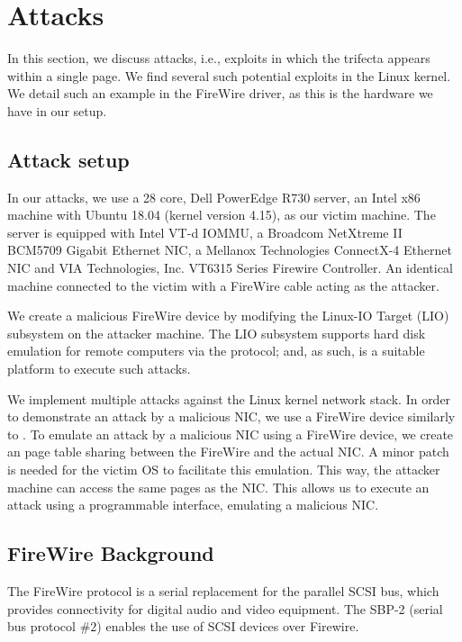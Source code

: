 \section{\Simple{} Attacks}\label{sec:attack_setup}

In this section, we discuss \simple{} attacks, i.e., exploits in which the trifecta appears within a single page.
We find several such potential \simple{} exploits in the Linux kernel. We detail such an example in the FireWire driver, as this is the hardware we have in our setup. 



\subsection{Attack setup}
In our attacks, we use a 28 core, Dell PowerEdge R730 server, an Intel x86 machine with Ubuntu 18.04 (kernel version 4.15), as our victim machine. The server is equipped with Intel VT-d IOMMU, a Broadcom NetXtreme II BCM5709 Gigabit Ethernet NIC, a Mellanox Technologies ConnectX-4 Ethernet NIC and VIA Technologies, Inc. VT6315 Series Firewire Controller. An identical machine connected to the victim with a FireWire cable acting as the attacker. 

We create a malicious FireWire device by modifying the Linux-IO Target (LIO) subsystem on the attacker machine. The LIO subsystem supports hard disk emulation for remote computers via the \spb{} protocol; and, as such, is a suitable platform to execute such attacks. 

We implement multiple attacks against the Linux kernel network stack. In order to demonstrate an attack by a malicious NIC, we use a FireWire device similarly to \cite{SLND10}. To emulate an attack by a malicious NIC using a FireWire device, we create an \iova{} page table sharing between the FireWire and the actual NIC. A minor patch is needed for the victim OS to facilitate this emulation. This way, the attacker machine can access the same pages as the NIC. This allows us to execute an attack using a programmable interface, emulating a malicious NIC.

\subsection{FireWire Background}

The FireWire protocol is a serial replacement for the parallel SCSI bus, which provides connectivity for digital audio and video equipment. The SBP-2 (serial bus protocol $\#2$) enables the use of SCSI devices over Firewire. 

